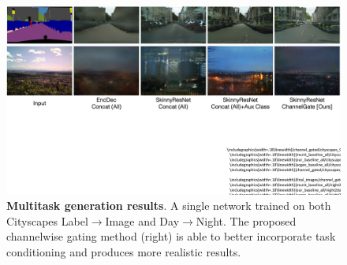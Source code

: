 \begin{figure}[h]
    \centering
    \includegraphics[width=1.\linewidth]{paper_images/multitask_comp.pdf}
    \caption{\textbf{Multitask generation results}. A single network trained on both Cityscapes Label$\rightarrow$Image and Day$\rightarrow$Night. The proposed channelwise gating method (right) is able to better incorporate task conditioning and produces more realistic results.
    }
    \label{fig:multi-task_day2night}
    \vspace{-2mm}
\end{figure}

